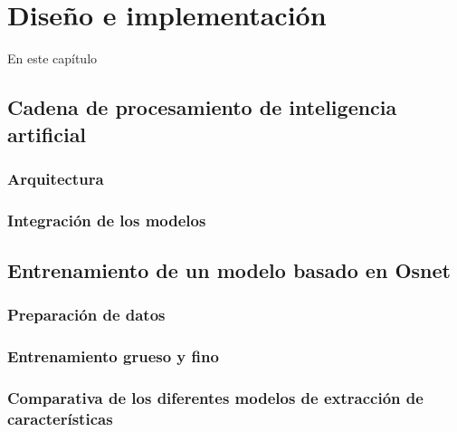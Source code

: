 \chapter{Diseño e implementación} %

\label{Chapter3} %

En este capítulo


\section{Cadena de procesamiento de inteligencia artificial}
\label{sec:cadenaProcesamiento}

\subsection{Arquitectura}

\subsection{Integración de los modelos}


\section{Entrenamiento de un modelo basado en Osnet}
\label{sec:entrenamientoOsnet}

\subsection{Preparación de datos}

\subsection{Entrenamiento grueso y fino}

\subsection{Comparativa de los diferentes modelos de extracción de características}
\label{sec:comparativaExtractores}

